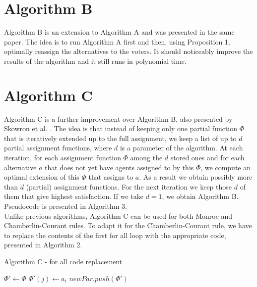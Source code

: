 \section{Algorithm B}

Algorithm B is an extension to Algorithm A and was presented in the same paper. The idea is to run Algorithm A first and then, using Proposition 1, optimally reassign the alternatives to the voters. It should noticeably improve the results of the algorithm and it still runs in polynomial time.

\section{Algorithm C}

Algorithm C is a further improvement over Algorithm B, also presented by Skowron et al. \cite{1}. The idea is that instead of keeping only one partial function $\Phi$ that is iteratively extended up to the full assignment, we keep a list of up to $d$ partial assignment functions, where $d$ is a parameter of the algorithm. At each iteration, for each assignment function $\Phi$ among the $d$ stored ones and for each alternative $a$ that does not yet have agents assigned to by this $\Phi$, we compute an optimal extension of this $\Phi$ that assigns to $a$. As a result we obtain possibly more than $d$ (partial) assignment functions. For the next iteration we keep those $d$ of them that give highest satisfaction. If we take $d = 1$, we obtain Algorithm B. Pseudocode is presented in Algorithm 3.
\\

Unlike previous algorithms, Algorithm C can be used for both Monroe and Chamberlin-Courant rules. To adapt it for the Chamberlin-Courant rule, we have to replace the contents of the first for all loop with the appropriate code, presented in Algorithm 2.

\begin{algorithm}
\caption{Algorithm C - for all code replacement}\label{euclid}
\begin{algorithmic}[1]
		\State $\Phi' \gets \Phi$
				\State $\Phi'(j) \gets a_{i}$
			\EndIf
		\EndFor
		\State $newPar.push(\Phi')$
	\EndFor
\end{algorithmic}
\end{algorithm}

